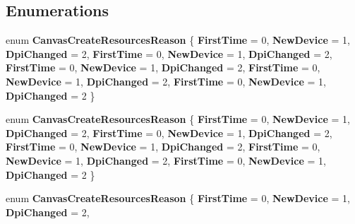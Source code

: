 \subsection*{Enumerations}
\begin{DoxyCompactItemize}
\item 
\mbox{\label{namespace_microsoft_1_1_graphics_1_1_canvas_1_1_u_i_a0436749846ae2726b5c840ff8b5f378a}} 
enum {\bfseries Canvas\+Create\+Resources\+Reason} \{ \newline
{\bfseries First\+Time} = 0, 
{\bfseries New\+Device} = 1, 
{\bfseries Dpi\+Changed} = 2, 
{\bfseries First\+Time} = 0, 
\newline
{\bfseries New\+Device} = 1, 
{\bfseries Dpi\+Changed} = 2, 
{\bfseries First\+Time} = 0, 
{\bfseries New\+Device} = 1, 
\newline
{\bfseries Dpi\+Changed} = 2, 
{\bfseries First\+Time} = 0, 
{\bfseries New\+Device} = 1, 
{\bfseries Dpi\+Changed} = 2, 
\newline
{\bfseries First\+Time} = 0, 
{\bfseries New\+Device} = 1, 
{\bfseries Dpi\+Changed} = 2
 \}
\item 
\mbox{\label{namespace_microsoft_1_1_graphics_1_1_canvas_1_1_u_i_a0436749846ae2726b5c840ff8b5f378a}} 
enum {\bfseries Canvas\+Create\+Resources\+Reason} \{ \newline
{\bfseries First\+Time} = 0, 
{\bfseries New\+Device} = 1, 
{\bfseries Dpi\+Changed} = 2, 
{\bfseries First\+Time} = 0, 
\newline
{\bfseries New\+Device} = 1, 
{\bfseries Dpi\+Changed} = 2, 
{\bfseries First\+Time} = 0, 
{\bfseries New\+Device} = 1, 
\newline
{\bfseries Dpi\+Changed} = 2, 
{\bfseries First\+Time} = 0, 
{\bfseries New\+Device} = 1, 
{\bfseries Dpi\+Changed} = 2, 
\newline
{\bfseries First\+Time} = 0, 
{\bfseries New\+Device} = 1, 
{\bfseries Dpi\+Changed} = 2
 \}
\item 
\mbox{\label{namespace_microsoft_1_1_graphics_1_1_canvas_1_1_u_i_a0436749846ae2726b5c840ff8b5f378a}} 
enum {\bfseries Canvas\+Create\+Resources\+Reason} \{ \newline
{\bfseries First\+Time} = 0, 
{\bfseries New\+Device} = 1, 
{\bfseries Dpi\+Changed} = 2, 

\end{DoxyCompactItemize}
